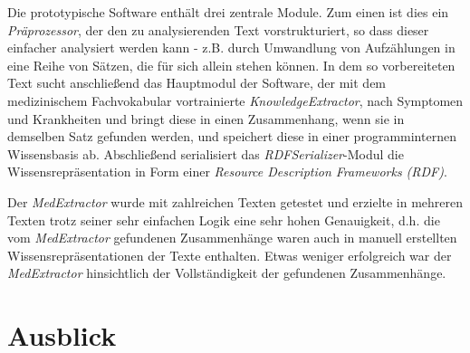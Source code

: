 Die prototypische Software enthält drei zentrale Module. Zum einen ist dies ein \emph{Präprozessor}, der den zu analysierenden Text vorstrukturiert, so dass dieser einfacher analysiert werden kann - z.B. durch Umwandlung von Aufzählungen in eine Reihe von Sätzen, die für sich allein stehen können. In dem so vorbereiteten Text sucht anschließend das Hauptmodul der Software, der mit dem medizinischem Fachvokabular vortrainierte \emph{KnowledgeExtractor}, nach Symptomen und Krankheiten und bringt diese in einen Zusammenhang, wenn sie in demselben Satz gefunden werden, und speichert diese in einer programminternen Wissensbasis ab. Abschließend serialisiert das \emph{RDFSerializer}-Modul die Wissensrepräsentation in Form einer \emph{Resource Description Frameworks (RDF)}.

Der \emph{MedExtractor} wurde mit zahlreichen Texten getestet und erzielte in mehreren Texten trotz seiner sehr einfachen Logik eine sehr hohen Genauigkeit, d.h. die vom \emph{MedExtractor} gefundenen Zusammenhänge waren auch in manuell erstellten Wissensrepräsentationen der Texte enthalten. Etwas weniger erfolgreich war der \emph{MedExtractor} hinsichtlich der Vollständigkeit der gefundenen Zusammenhänge.


\section{Ausblick}
\label{sec:Ausblick} 